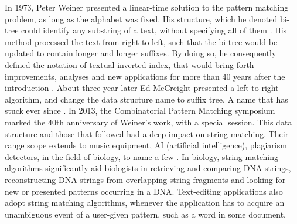 \documentclass[12pt]{article} %
\begin{document}
In 1973, Peter Weiner presented a linear-time solution to the pattern matching problem, as long as the alphabet was fixed. His structure, which he denoted bi-tree could identify any substring of a text, without specifying all of them \cite{apostolico201640}. His method processed the text from right to left,  such that the bi-tree would be updated to contain longer and longer suffixes. By doing so, he consequently defined the notation of textual inverted index, that would bring forth improvements, analyses and new applications for more than 40 years after the introduction \cite{apostolico201640}. About three year later Ed McCreight presented a left to right algorithm, and change the data structure name to suffix tree. A name that has stuck ever since \cite{ apostolico201640}. In 2013, the Combinatorial Pattern Matching symposium marked the 40th anniversary of Weiner’s work, with a special session. This data structure and those that followed had a deep impact on string matching. Their range scope extends to music equipment, AI (artificial intelligence), plagiarism detectors, in the field of biology, to name a few \cite{detection, apostolico201640}. In biology, string matching algorithms significantly aid biologists in retrieving and comparing DNA strings, reconstructing DNA strings from overlapping string fragments and looking for new or presented patterns occurring in a DNA\cite{gusfield}. Text-editing applications also adopt string matching algorithms, whenever the application has to acquire an unambiguous event of a user-given pattern, such as a word in some document\cite{introduction, gusfield}. \\ \\
\end{document}
